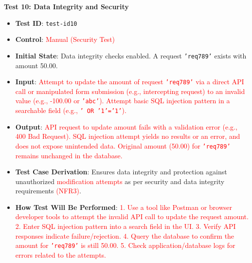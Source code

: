 \documentclass[12pt, titlepage]{article}
\begin{document}
\textbf{Test 10: Data Integrity and Security} \label{test-id10}
\begin{itemize}
    \item \textbf{Test ID}: \texttt{test-id10}
    \item \textbf{Control}: \textcolor{red}{Manual (Security Test)}
    \item \textbf{Initial State}: Data integrity checks enabled. A request \texttt{'req789'} exists with amount 50.00.
    \item \textbf{Input}: \textcolor{red}{Attempt to update the amount of request \texttt{'req789'} via a direct API call or manipulated form submission (e.g., intercepting request) to an invalid value (e.g., -100.00 or \texttt{'abc'}). Attempt basic SQL injection pattern in a searchable field (e.g., \texttt{' OR '1'='1'}).}
    \item \textbf{Output}: \textcolor{red}{API request to update amount fails with a validation error (e.g., 400 Bad Request). SQL injection attempt yields no results or an error, and does not expose unintended data. Original amount (50.00) for \texttt{'req789'} remains unchanged in the database.}
    \item \textbf{Test Case Derivation}: Ensures data integrity and protection against unauthorized \textcolor{red}{modification attempts} as per security and data integrity requirements \textcolor{red}{(NFR3)}.
    \item \textbf{How Test Will Be Performed}: \textcolor{red}{1. Use a tool like Postman or browser developer tools to attempt the invalid API call to update the request amount. 2. Enter SQL injection pattern into a search field in the UI. 3. Verify API responses indicate failure/rejection. 4. Query the database to confirm the amount for \texttt{'req789'} is still 50.00. 5. Check application/database logs for errors related to the attempts.}
\end{itemize}
\end{document}
